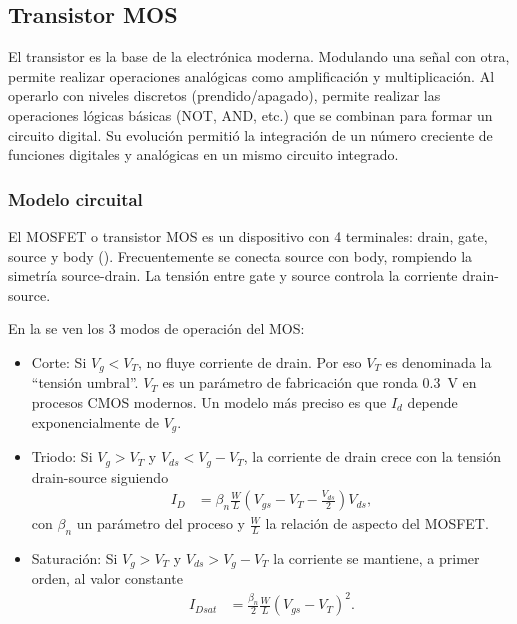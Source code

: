 \subsection{Transistor MOS}
El transistor es la base de la electrónica moderna.
Modulando una señal con otra, 
permite realizar operaciones analógicas como amplificación y multiplicación.
Al operarlo con niveles discretos (prendido/apagado),
permite realizar las operaciones lógicas básicas (NOT, AND, etc.) que
se combinan para formar un circuito digital.
Su evolución permitió la integración de un número creciente de funciones
digitales y analógicas en un mismo circuito integrado.
%
\subsubsection{Modelo circuital}
El MOSFET o transistor MOS es un dispositivo con 4 terminales:
drain, gate, source y body ().
Frecuentemente se conecta source con body, rompiendo la simetría source-drain.
La tensión entre gate y source controla la corriente drain-source.

En la  se ven los 3 modos de operación del MOS:
\begin{itemize}
    \item Corte: Si $V_g<V_T$, no fluye corriente de drain.
        Por eso $V_T$ es denominada la ``tensión umbral''.
        $V_T$ es un parámetro de fabricación que ronda \SI{.3}{\volt} en procesos CMOS
        modernos.
        Un modelo más preciso es que $I_d$ depende exponencialmente de $V_g$.
    \item Triodo: Si $V_g>V_T$ y $V_{ds}<V_g-V_T$, la corriente de drain crece con la
        tensión drain-source siguiendo
        \begin{align*}
            I_D&=\beta_n\frac WL(V_{gs}-V_T-\frac{V_{ds}}2)V_{ds},
        \end{align*}
        con $\beta_n$ un parámetro del proceso y $\frac WL$ la relación de
        aspecto del MOSFET.
    \item Saturación: Si $V_g>V_T$ y $V_{ds}>V_g-V_T$ la corriente se mantiene, a primer
        orden, al valor constante
        \begin{align*}
            I_{Dsat}&=\frac{\beta_n}2\frac WL(V_{gs}-V_T)^2.
        \end{align*}
\end{itemize}
%
